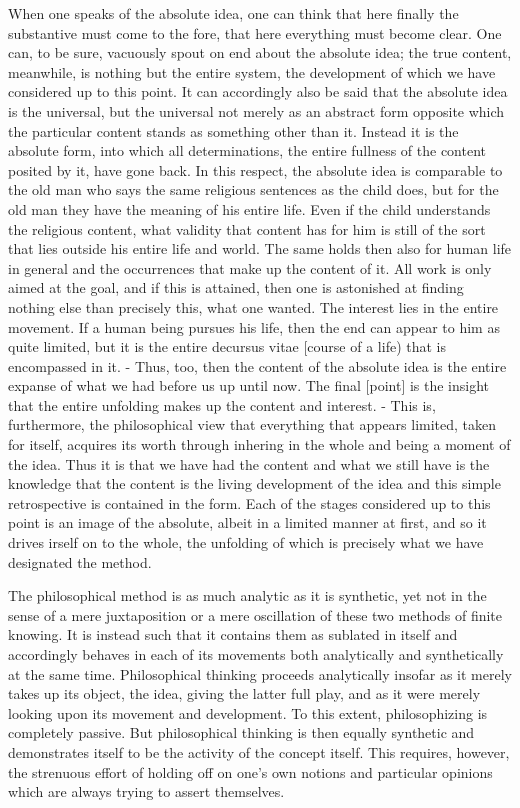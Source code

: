     When one speaks of the absolute idea, one can think that here finally
    the substantive must come to the fore, that here everything must become clear.
    One can, to be sure, vacuously spout on end about the absolute idea; the true
    content, meanwhile, is nothing but the entire system, the development of which
    we have considered up to this point. It can accordingly also be said that the absolute
    idea is the universal, but the universal not merely as an abstract form opposite
    which the particular content stands as something other than it. Instead it is the
    absolute form, into which all determinations, the entire fullness of the content
    posited by it, have gone back. In this respect, the absolute idea is comparable to
    the old man who says the same religious sentences as the child does, but for the
    old man they have the meaning of his entire life. Even if the child understands
    the religious content, what validity that content has for him is still of the sort that
    lies outside his entire life and world. The same holds then also for human life in
    general and the occurrences that make up the content of it. All work is only aimed
    at the goal, and if this is attained, then one is astonished at finding nothing else
    than precisely this, what one wanted. The interest lies in the entire movement. If
    a human being pursues his life, then the end can appear to him as quite limited,
    but it is the entire decursus vitae [course of a life) that is encompassed in it. - Thus,
    too, then the content of the absolute idea is the entire expanse of what we had
    before us up until now. The final [point] is the insight that the entire unfolding
    makes up the content and interest. - This is, furthermore, the philosophical view
    that everything that appears limited, taken for itself, acquires its worth through
    inhering in the whole and being a moment of the idea. Thus it is that we have
    had the content and what we still have is the knowledge that the content
    is the living development of the idea and this simple retrospective is contained
    in the form. Each of the stages considered up to this point is an image of the
    absolute, albeit in a limited manner at first, and so it drives irself on to the whole,
    the unfolding of which is precisely what we have designated the method.

    The philosophical method is as much analytic as it is synthetic,
    yet not in the sense of a mere juxtaposition or a mere oscillation of
    these two methods of finite knowing.
    It is instead such that it contains them as sublated in itself
    and accordingly behaves in each of its movements
    both analytically and synthetically at the same time.
    Philosophical thinking proceeds analytically insofar
    as it merely takes up its object, the idea, giving the latter full play,
    and as it were merely looking upon its movement and development.
    To this extent, philosophizing is completely passive.
    But philosophical thinking is then equally synthetic and
    demonstrates itself to be the activity of the concept itself.
    This requires, however, the strenuous effort of holding off on one's own notions
    and particular opinions which are always trying to assert themselves.

